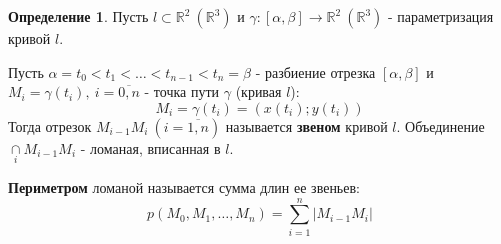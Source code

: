 \documentclass{report}
\theoremstyle{definition}
\newtheorem*{definition}{Определение}
\begin{document}
\begin{definition}
    Пусть $l \subset \mathbb{R}^2 \ (\mathbb{R}^3)$ и $\gamma:[\alpha,\beta]\rightarrow\mathbb{R}^2 \
        (\mathbb{R}^3)$ - параметризация кривой $l$.

    Пусть $\alpha = t_0 < t_1 < \ldots < t_{n-1} < t_n = \beta$ - разбиение отрезка $[\alpha,\beta]$
    и $M_i = \gamma(t_i), \ i=\overline{0,n}$ - точка пути $\gamma$ (кривая $l$):
    \begin{equation*}
        M_i = \gamma (t_i) = (x(t_i);y(t_i))
    \end{equation*}
    Тогда отрезок $M_{i-1}M_i \ (i = \overline{1,n})$ называется \textbf{звеном} кривой $l$.
    Объединение $\underset{i}{\cap}M_{i-1}M_i$ - ломаная, вписанная в $l$.

    \textbf{Периметром} ломаной называется сумма длин ее звеньев:
    \begin{equation*}
        p(M_0,M_1,\ldots,M_n) = \sum_{i=1}^{n}| M_{i-1}M_i |
    \end{equation*}
    \begin{figure}[h]
        \begin{minipage}[h]{0.49\linewidth}
        \end{minipage}
        \hfill
        \begin{minipage}[h]{0.49\linewidth}
        \end{minipage}
    \end{figure}
\end{definition}
\end{document}
